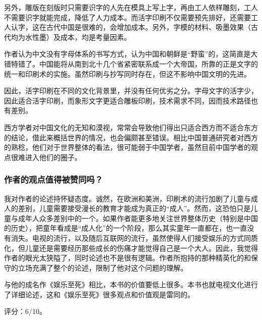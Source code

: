 另外，雕版在刻版时只需要识字的人先在模具上写上字，再由工人依样雕刻，工人不需要识字就能完成，降低了人力成本。而活字印刷不仅需要预先排好，还需要工人认字，这在古代中国是很难的，会增加成本。另外，字模的材料、吸墨效果（古代均为水性墨）及成本，均是考量因素。

作者认为中文没有字母体系的书写方式，认为中国和朝鲜是“野蛮”的，这简直是大错特错了。中国能将从南到北十几个省紧密联系成一个大帝国，所靠的正是文字的统一和印刷术的实施。虽然印刷与抄写同时存在，但这不影响中国文明的先进。

因此，活字印刷在不同的文化背景里，并没有任何优劣之分。字母文字的活字少，因此适合活字印刷，而象形文字更适合雕板印刷，技术需求不同，因而技术路径也有差别。

西方学者对中国文化的无知和漠视，常常会导致他们得出只适合西方而不适合东方的结论，借此来概括世界的情况，也会偏颇甚至错误。相比中国普通研究者对西方的熟稔，他们对于世界整体的看法，很可能弱于中国学者，虽然目前中国学者的观点很难进入他们的圈子。

\subsubsection{作者的观点值得被赞同吗？}
我对作者的论述持怀疑态度。诚然，在欧洲和美洲，印刷术的流行加剧了儿童与成人的差别，儿童需要接受漫长的教育才能成为真正的“成人”。然而，这恐怕只是儿童与成年人众多差别中的一个。如果作者能更多地关注世界整体历史（特别是中国的历史），把童年看成是“成人化”的一个阶段，那么其实童年一直都在，也一直没有消失。电视的流行，以及随后互联网的流行，虽然使得人们接受娱乐的方式同质化，但儿童还是需要经历那些成长的伤痛才能觉得自己是一个大人。因此，我觉得作者的眼光太狭隘了，同时论述也不是很有逻辑。作者所抱持的那种精英化的和保守的立场充满了整个的论述，限制了他对这个问题的理解。

与他的成名作《娱乐至死》相比，本书的价值要低上很多。本书也就电视文化进行了详细论述，这和《娱乐至死》很多观点和价值观是雷同的。

评分：6/10。
